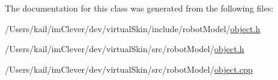 The documentation for this class was generated from the following files:\begin{DoxyCompactItemize}
\item 
/Users/kail/imClever/dev/virtualSkin/include/robotModel/\hyperlink{include_2robot_model_2object_8h}{object.h}\item 
/Users/kail/imClever/dev/virtualSkin/src/robotModel/\hyperlink{src_2robot_model_2object_8h}{object.h}\item 
/Users/kail/imClever/dev/virtualSkin/src/robotModel/\hyperlink{object_8cpp}{object.cpp}\end{DoxyCompactItemize}
